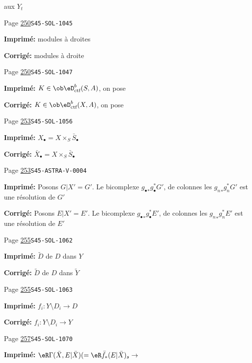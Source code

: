 \begin{description}
aux $Y_t$
\smallskip
\item[\hypertarget{apparatus:FR-0261}{261}] Page \hyperlink{printpage:fr:250}{250}\quad\texttt{S45-SOL-1045}
\par\noindent\textbf{Imprimé:} modules à droites
\par\noindent\textbf{Corrigé:} modules à droite
\smallskip
\item[\hypertarget{apparatus:FR-0262}{262}] Page \hyperlink{printpage:fr:250}{250}\quad\texttt{S45-SOL-1047}
\par\noindent\textbf{Imprimé:} $K\in\ob\eD_\text{ctf}^b(S,A)$, on pose
\par\noindent\textbf{Corrigé:} $K\in\ob\eD_\text{ctf}^b(X,A)$, on pose
\smallskip
\item[\hypertarget{apparatus:FR-0263}{263}] Page \hyperlink{printpage:fr:253}{253}\quad\texttt{S45-SOL-1056}
\par\noindent\textbf{Imprimé:} \(X_\bullet=X\times_S \bar S_\bullet\)
\par\noindent\textbf{Corrigé:} \(\bar X_\bullet=X\times_S \bar S_\bullet\)
\smallskip
\item[\hypertarget{apparatus:FR-0264}{264}] Page \hyperlink{printpage:fr:253}{253}\quad\texttt{S45-ASTRA-V-0004}
\par\noindent\textbf{Imprimé:} Posons $G|X'=G'$. Le bicomplexe 
${g_\bullet}_\ast g_\bullet^\ast G'$, de colonnes les 
${g_n}_\ast g_n^\ast G'$ est une résolution de $G'$
\par\noindent\textbf{Corrigé:} Posons $E|X'=E'$. Le bicomplexe 
${g_\bullet}_\ast g_\bullet^\ast E'$, de colonnes les 
${g_n}_\ast g_n^\ast E'$ est une résolution de $E'$
\smallskip
\item[\hypertarget{apparatus:FR-0265}{265}] Page \hyperlink{printpage:fr:255}{255}\quad\texttt{S45-SOL-1062}
\par\noindent\textbf{Imprimé:} $\widetilde D$ de $D$ dans $Y$
\par\noindent\textbf{Corrigé:} $\widetilde D$ de $D$ dans $\widetilde Y$
\smallskip
\item[\hypertarget{apparatus:FR-0266}{266}] Page \hyperlink{printpage:fr:255}{255}\quad\texttt{S45-SOL-1063}
\par\noindent\textbf{Imprimé:} \(f_i:Y\setminus D_i \to D\)
\par\noindent\textbf{Corrigé:} \(f_i:Y\setminus D_i \to Y\)
\smallskip
\item[\hypertarget{apparatus:FR-0267}{267}] Page \hyperlink{printpage:fr:257}{257}\quad\texttt{S45-SOL-1070}
\par\noindent\textbf{Imprimé:} \(\eR\Gamma(\bar X,E|\bar X) (=\eR\bar f_\ast (E|\bar X)_s \to\)

\end{description}
